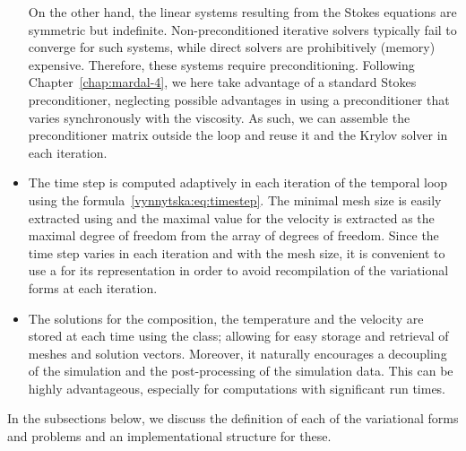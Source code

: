\begin{itemize}
  On the other hand, the linear systems resulting from the Stokes
  equations are symmetric but indefinite. Non-preconditioned iterative
  solvers typically fail to converge for such systems, while direct
  solvers are prohibitively (memory) expensive. Therefore, these
  systems require preconditioning. Following
  Chapter~\ref{chap:mardal-4}, we here take advantage of a standard
  Stokes preconditioner, neglecting possible advantages in using a
  preconditioner that varies synchronously with the viscosity.  As
  such, we can assemble the preconditioner matrix outside the loop and
  reuse it and the Krylov solver in each iteration.
\item
  The time step  is computed adaptively in each iteration of
  the temporal loop using the
  formula~\eqref{vynnytska:eq:timestep}. The minimal mesh size is
  easily extracted using  and the maximal value for
  the velocity is extracted as the maximal degree of freedom from
  the  array of degrees of freedom. Since the time step
  varies in each iteration and with the mesh size, it is convenient to
  use a  for its representation in order to avoid
  recompilation of the variational forms at each iteration.
\item
  The solutions for the composition, the temperature and the velocity
  are stored at each time using the  class; allowing
  for easy storage and retrieval of meshes and solution
  vectors. Moreover, it naturally encourages a decoupling of the
  simulation and the post-processing of the simulation data. This can
  be highly advantageous, especially for computations with significant
  run times.
\end{itemize}
In the subsections below, we discuss the definition of each of the
variational forms and problems and an implementational structure for
these.

